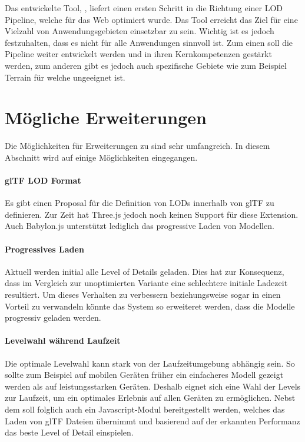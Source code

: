Das entwickelte Tool, , liefert einen ersten Schritt in die Richtung einer LOD Pipeline, welche für das Web optimiert wurde. Das Tool erreicht das Ziel für eine Vielzahl von Anwendungsgebieten einsetzbar zu sein. Wichtig ist es jedoch festzuhalten, dass es nicht für alle Anwendungen sinnvoll ist. Zum einen soll die Pipeline weiter entwickelt werden und in ihren Kernkompetenzen gestärkt werden, zum anderen gibt es jedoch auch spezifische Gebiete wie zum Beispiel Terrain für welche  ungeeignet ist.

\section{Mögliche Erweiterungen}
Die Möglichkeiten für Erweiterungen zu  sind sehr umfangreich. In diesem Abschnitt wird auf einige Möglichkeiten eingegangen.

\paragraph{glTF LOD Format}
Es gibt einen Proposal für die Definition von LODs innerhalb von glTF zu definieren. \cite{glTFExtensionLOD}
Zur Zeit hat Three.js jedoch noch keinen Support für diese Extension. Auch Babylon.js unterstützt lediglich das progressive Laden von Modellen. \cite{babylonProgressiveLoading}

\paragraph{Progressives Laden}
Aktuell werden initial alle Level of Details geladen. Dies hat zur Konsequenz, dass im Vergleich zur unoptimierten Variante eine schlechtere initiale Ladezeit resultiert. Um dieses Verhalten zu verbessern beziehungsweise sogar in einen Vorteil zu verwandeln könnte das System so erweiteret werden, dass die Modelle progressiv geladen werden.

\paragraph{Levelwahl während Laufzeit}
Die optimale Levelwahl kann stark von der Laufzeitumgebung abhängig sein. So sollte zum Beispiel auf mobilen Geräten früher ein einfacheres Modell gezeigt werden als auf leistungsstarken Geräten.
Deshalb eignet sich eine Wahl der Levels zur Laufzeit, um ein optimales Erlebnis auf allen Geräten zu ermöglichen.
Nebst dem  soll folglich auch ein Javascript-Modul bereitgestellt werden, welches das Laden von glTF Dateien übernimmt und basierend auf der erkannten Performanz das beste Level of Detail einspielen.

